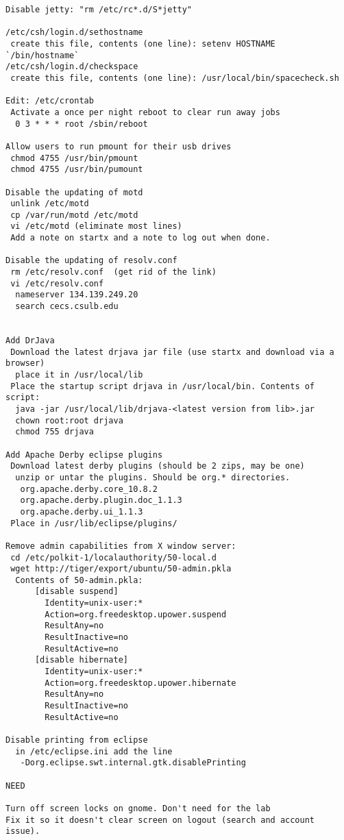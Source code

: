 \begin{verbatim}
Disable jetty: "rm /etc/rc*.d/S*jetty"

/etc/csh/login.d/sethostname
 create this file, contents (one line): setenv HOSTNAME `/bin/hostname`
/etc/csh/login.d/checkspace
 create this file, contents (one line): /usr/local/bin/spacecheck.sh

Edit: /etc/crontab
 Activate a once per night reboot to clear run away jobs
  0 3 * * * root /sbin/reboot

Allow users to run pmount for their usb drives
 chmod 4755 /usr/bin/pmount 
 chmod 4755 /usr/bin/pumount 

Disable the updating of motd
 unlink /etc/motd
 cp /var/run/motd /etc/motd
 vi /etc/motd (eliminate most lines)
 Add a note on startx and a note to log out when done. 

Disable the updating of resolv.conf
 rm /etc/resolv.conf  (get rid of the link)
 vi /etc/resolv.conf
  nameserver 134.139.249.20
  search cecs.csulb.edu


Add DrJava
 Download the latest drjava jar file (use startx and download via a browser)
  place it in /usr/local/lib
 Place the startup script drjava in /usr/local/bin. Contents of script:
  java -jar /usr/local/lib/drjava-<latest version from lib>.jar
  chown root:root drjava
  chmod 755 drjava

Add Apache Derby eclipse plugins
 Download latest derby plugins (should be 2 zips, may be one)
  unzip or untar the plugins. Should be org.* directories.
   org.apache.derby.core_10.8.2
   org.apache.derby.plugin.doc_1.1.3
   org.apache.derby.ui_1.1.3
 Place in /usr/lib/eclipse/plugins/
   
Remove admin capabilities from X window server:
 cd /etc/polkit-1/localauthority/50-local.d
 wget http://tiger/export/ubuntu/50-admin.pkla
  Contents of 50-admin.pkla:
      [disable suspend]
        Identity=unix-user:*
        Action=org.freedesktop.upower.suspend
        ResultAny=no
        ResultInactive=no
        ResultActive=no
      [disable hibernate]
        Identity=unix-user:*
        Action=org.freedesktop.upower.hibernate
        ResultAny=no
        ResultInactive=no
        ResultActive=no

Disable printing from eclipse
  in /etc/eclipse.ini add the line
   -Dorg.eclipse.swt.internal.gtk.disablePrinting

NEED

Turn off screen locks on gnome. Don't need for the lab
Fix it so it doesn't clear screen on logout (search and account issue).


\end{verbatim}
